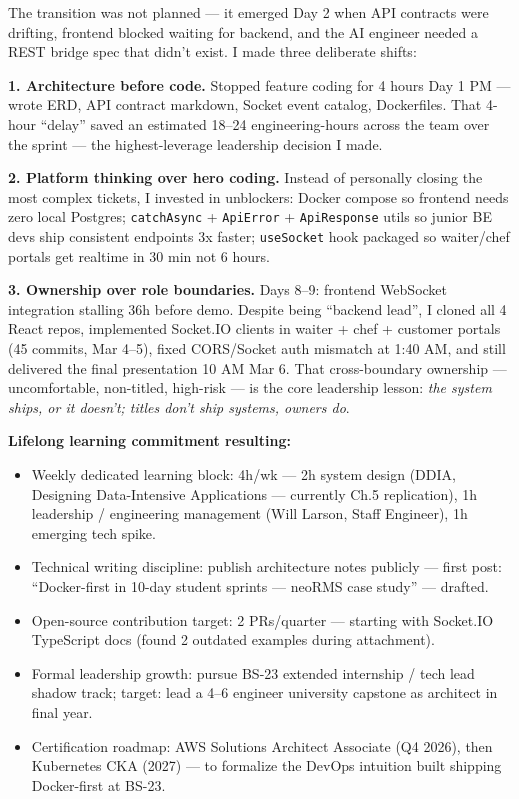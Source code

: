 The transition was not planned --- it emerged Day 2 when API contracts were drifting, frontend blocked waiting for backend, and the AI engineer needed a REST bridge spec that didn't exist. I made three deliberate shifts:

\textbf{1. Architecture before code.} Stopped feature coding for 4 hours Day 1 PM --- wrote ERD, API contract markdown, Socket event catalog, Dockerfiles. That 4-hour ``delay'' saved an estimated 18--24 engineering-hours across the team over the sprint --- the highest-leverage leadership decision I made.

\textbf{2. Platform thinking over hero coding.} Instead of personally closing the most complex tickets, I invested in unblockers: Docker compose so frontend needs zero local Postgres; \texttt{catchAsync} + \texttt{ApiError} + \texttt{ApiResponse} utils so junior BE devs ship consistent endpoints 3x faster; \texttt{useSocket} hook packaged so waiter/chef portals get realtime in 30 min not 6 hours.

\textbf{3. Ownership over role boundaries.} Days 8--9: frontend WebSocket integration stalling 36h before demo. Despite being ``backend lead'', I cloned all 4 React repos, implemented Socket.IO clients in waiter + chef + customer portals (45 commits, Mar 4--5), fixed CORS/Socket auth mismatch at 1:40 AM, and still delivered the final presentation 10 AM Mar 6. That cross-boundary ownership --- uncomfortable, non-titled, high-risk --- is the core leadership lesson: \textit{the system ships, or it doesn't; titles don't ship systems, owners do}.

\textbf{Lifelong learning commitment resulting:}
\begin{itemize}
\item Weekly dedicated learning block: 4h/wk --- 2h system design (DDIA, Designing Data-Intensive Applications --- currently Ch.5 replication), 1h leadership / engineering management (Will Larson, Staff Engineer), 1h emerging tech spike.
\item Technical writing discipline: publish architecture notes publicly --- first post: ``Docker-first in 10-day student sprints --- neoRMS case study'' --- drafted.
\item Open-source contribution target: 2 PRs/quarter --- starting with Socket.IO TypeScript docs (found 2 outdated examples during attachment).
\item Formal leadership growth: pursue BS-23 extended internship / tech lead shadow track; target: lead a 4--6 engineer university capstone as architect in final year.
\item Certification roadmap: AWS Solutions Architect Associate (Q4 2026), then Kubernetes CKA (2027) --- to formalize the DevOps intuition built shipping Docker-first at BS-23.
\end{itemize}

